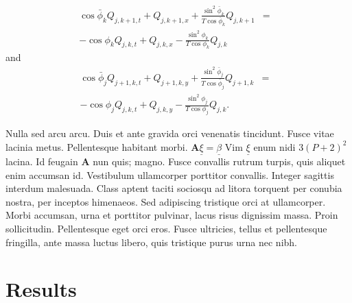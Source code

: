 \documentclass[a0,landscape]{a0poster}
\begin{document}
\begin{multicols}{4}
    \begin{eqnarray}
        \cos\bar{\phi}_k Q_{j,k+1,t} + Q_{j,k+1,x}+\frac{\sin^2\bar{\phi}_k}{T\cos\bar{\phi}_k} Q_{j,k+1} &=&\nonumber\\
        -\cos\phi_k Q_{j,k,t} + Q_{j,k,x}-\frac{\sin^2\phi_k}{T\cos\phi_k} Q_{j,k}\label{edgek}
    \end{eqnarray}
    and
    \begin{eqnarray}
        \cos\bar{\phi}_j Q_{j+1,k,t} + Q_{j+1,k,y}+\frac{\sin^2\bar{\phi}_j}{T\cos\bar{\phi}_j} Q_{j+1,k}&=&\nonumber \\
        -\cos\phi_j Q_{j,k,t} + Q_{j,k,y}-\frac{\sin^2\phi_j}{T\cos\phi_j} Q_{j,k}.\label{edgej}
    \end{eqnarray}

    Nulla sed arcu arcu. Duis et ante gravida orci venenatis tincidunt. Fusce vitae lacinia metus. Pellentesque habitant morbi. $\mathbf{A}\underline{\xi}=\underline{\beta}$ Vim $\underline{\xi}$ enum nidi $3(P+2)^{2}$ lacina. Id feugain $\mathbf{A}$ nun quis; magno. Fusce convallis rutrum turpis, quis aliquet enim accumsan id. Vestibulum ullamcorper porttitor convallis. Integer sagittis interdum malesuada. Class aptent taciti sociosqu ad litora torquent per conubia nostra, per inceptos himenaeos. Sed adipiscing tristique orci at ullamcorper. Morbi accumsan, urna et porttitor pulvinar, lacus risus dignissim massa. Proin sollicitudin. Pellentesque eget orci eros. Fusce ultricies, tellus et pellentesque fringilla, ante massa luctus libero, quis tristique purus urna nec nibh.


    \section*{Results}


\end{multicols}
\end{document}
